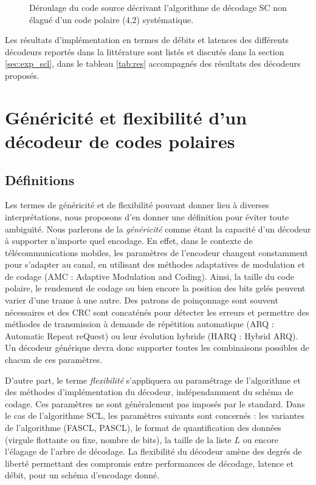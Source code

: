 \begin{figure}[t]
{\begin{minipage}{.35\linewidth}
  \label{fig:unrolled_tree}
  \end{minipage}%
  }
  \caption{Déroulage du code source décrivant l'algorithme de décodage SC non élagué d'un code polaire (4,2) systématique.}
  \label{fig:unrolling}
\end{figure}

Les résultats d'implémentation en termes de débits et latences des différents décodeurs reportés dans la littérature \cite{sarkis_increasing_2014,sarkis_fast_2016,shen_low-latency_2016} sont listés et discutés dans la section \ref{sec:exp_scl}, dans le tableau \ref{tab:res} accompagnés des résultats des décodeurs proposés.

\section{Généricité et flexibilité d'un décodeur de codes polaires}
\label{sec:gen_scl}

\subsection{Définitions}
Les termes de généricité et de flexibilité pouvant donner lieu à diverses interprétations, nous proposons d'en donner une définition pour éviter toute ambiguïté.
Nous parlerons de la \textit{généricité} comme étant la capacité d'un décodeur à supporter n'importe quel encodage.
En effet, dans le contexte de télécommunications mobiles, les paramètres de l'encodeur changent constamment pour s'adapter au canal, en utilisant des méthodes adaptatives de modulation et de codage \cite{dahlman_4g:_2013} (AMC : Adaptive Modulation and Coding). Ainsi, la taille du code polaire, le rendement de codage ou bien encore la position des bits gelés peuvent varier d'une trame à une autre. Des patrons de poinçonnage sont souvent nécessaires et des CRC sont concaténés pour détecter les erreurs et permettre des méthodes de transmission à demande de répétition automatique (ARQ : Automatic Repeat reQuest) ou leur évolution hybride (HARQ : Hybrid ARQ). Un décodeur générique devra donc supporter toutes les combinaisons possibles de chacun de ces paramètres.

D'autre part, le terme \textit{flexibilité} s'appliquera au paramétrage de l'algorithme et des méthodes d'implémentation du décodeur, indépendamment du schéma de codage. Ces paramètres ne sont généralement pas imposés par le standard. Dans le cas de l'algorithme SCL, les paramètres suivants sont concernés : les variantes de l'algorithme (FASCL, PASCL), le format de quantification des données (virgule flottante ou fixe, nombre de bits), la taille de la liste $L$ ou encore l'élagage de l'arbre de décodage. La flexibilité du décodeur amène des degrés de liberté permettant des compromis entre performances de décodage, latence et débit, pour un schéma d'encodage donné.

